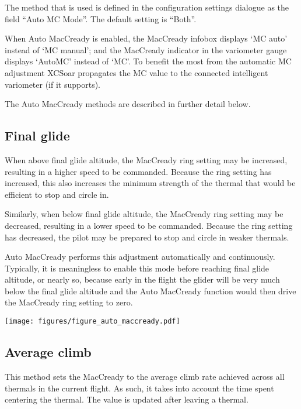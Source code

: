 The method that is used is defined in the configuration settings dialogue as the
field ``Auto MC Mode''.  The default setting is ``Both''.

When Auto MacCready is enabled, the MacCready infobox displays `MC auto'
instead of `MC manual'; and the MacCready indicator in the variometer
gauge displays `AutoMC' instead of `MC'.
To benefit the most from the automatic MC adjustment XCSoar propagates the MC
value to the connected intelligent variometer (if it supports).

The Auto MacCready methods are described in further detail below.


\subsection*{Final glide}

When above final glide altitude, the MacCready ring setting may be
increased, resulting in a higher speed to be commanded.  Because the
ring setting has increased, this also increases the minimum strength
of the thermal that would be efficient to stop and circle in.

Similarly, when below final glide altitude, the MacCready ring setting
may be decreased, resulting in a lower speed to be commanded.  Because
the ring setting has decreased, the pilot may be prepared to stop and
circle in weaker thermals.

Auto MacCready performs this adjustment automatically and
continuously.  Typically, it is meaningless to enable this mode before
reaching final glide altitude, or nearly so, because early in the
flight the glider will be very much below the final glide altitude and
the Auto MacCready function would then drive the MacCready ring
setting to zero.

\begin{maxipage}
\begin{center}
\texttt{[image: figures/figure\_auto\_maccready.pdf]}
\end{center}
\end{maxipage}


\subsection*{Average climb}

This method sets the MacCready to the average climb rate achieved
across all thermals in the current flight.  As such, it takes into
account the time spent centering the thermal.  The value is updated
after leaving a thermal.

